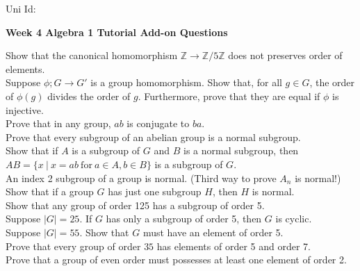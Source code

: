 \documentclass[12pt]{article}
\theoremstyle{plain}
\numberwithin{equation}{section}
\numberwithin{figure}{section}
\newcommand{\Z}{{\mathbb Z}}
\newcommand{\<}{\langle}
\renewcommand{\>}{\rangle}
\begin{document}
  \hspace{3.8cm} Uni Id: 

\vspace{10mm}





\centerline{\bf {\Large  
Week 4 Algebra 1 Tutorial Add-on Questions} }


\vspace{10mm}

\vspace{5mm}

    Show that the canonical homomorphism
$\Z \rightarrow \Z / 5\Z$ does not preserves order of elements.\\

   Suppose $\phi;G \rightarrow G'$ is a group homomorphism. 
 	Show that, for all $g \in G$, the order of $\phi(g)$ divides the order of $g$. 
 	Furthermore, prove that they are equal if $ \phi$ is injective.\\


  Prove that in any group, $ab$ is conjugate to $ba$.\\

  Prove that every subgroup of an abelian group is a normal subgroup.\\
 
  Show that if $A$ is a subgroup of $G$ and $B$ is a normal subgroup, then $AB = \{x \ | \ x =ab \ \text{for} \ a \in A, b \in B \}$ is a subgroup of $G$.\\
 
  An index 2 subgroup of a group is normal. (Third way to prove $A_n$ is normal!)\\

 Show that if a group $G$ has just one subgroup $H$, then $H$ is normal.\\

 
  Show that any group of order 125 has a subgroup of order 5.\\
 
   Suppose $|G| = 25$. 
  If $G$ has only a subgroup of order 5, then $G$ is cyclic. \\
  
    Suppose $|G| = 55$. 
   Show that $G$ must have an element of order 5. \\
  
    Prove that every group of order $35$ has elements of order 5 and order 7.\\
   
    Prove that a group of even order must possesses at least one element of order 2.
  
 
\end{document}
